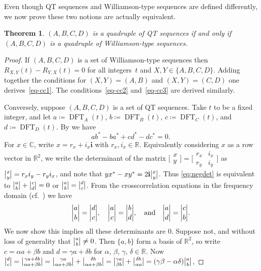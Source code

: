 \documentclass[12pt]{article}
\numberwithin{equation}{section}
\newtheorem{theorem}{Theorem}
\newcommand{\qi}{\mathbf{i}}
\newcommand{\C}{\mathbb{C}}
\newcommand{\R}{\mathbb{R}}
\DeclareMathOperator{\DFT}{DFT}
\newcommand{\detii}{\genfrac{\lvert}{\rvert}{0pt}{}}
\begin{document}
Even though QT sequences and Williamson-type sequences are defined
differently, we now prove these two notions are actually equivalent.

\begin{theorem}
$(A,B,C,D)$ is a quadruple of QT sequences if and only if $(A,B,C,D)$ is a quadruple of
Williamson-type sequences.
\label{thm:qt-wt-equiv}
\end{theorem}

\begin{proof}
If $(A,B,C,D)$ is a set of Williamson-type sequences then $R_{X,Y}(t)-R_{Y,X}(t)=0$
for all integers~$t$ and $X,Y\in\{A,B,C,D\}$.  Adding together the conditions
for $(X,Y)=(A,B)$ and $(X,Y)=(C,D)$
one derives~\eqref{eq-cc1}.  The conditions~\eqref{eq-cc2} and~\eqref{eq-cc3}
are derived similarly.

Conversely, suppose $(A,B,C,D)$ is a set of QT sequences. Take $t$ to be a fixed integer,
and let $a\coloneqq\DFT_A(t)$, $b\coloneqq\DFT_B(t)$, $c\coloneqq\DFT_C(t)$, and
$d\coloneqq\DFT_D(t)$.  By  we have
\begin{equation} ab^* - ba^* + cd^* - dc^* = 0. \label{eq:negdet} \end{equation}
For $x\in\C$, write $x=r_x+i_x\qi$ with $r_x,i_x\in\R$.
Equivalently considering $x$ as a row vector in $\R^2$,
we write the determinant of the matrix $\bigl[\begin{smallmatrix}x\\y\end{smallmatrix}\bigr]=\bigl[\begin{smallmatrix}r_x&i_x\\r_y&i_y\end{smallmatrix}\bigr]$
as $\detii{x}{y}=r_xi_y-r_yi_x$, and note that $yx^*-xy^*=2\qi\detii{x}{y}$.
Thus \eqref{eq:negdet} is equivalent to $\detii{a}{b}+\detii{c}{d} = 0$ or
$\detii{a}{b}=\detii{d}{c}$.  From the crosscorrelation equations in the
frequency domain (cf.~) we have
\begin{equation} \detii{a}{b}=\detii{d}{c}, \quad \detii{a}{c}=\detii{b}{d}, \quad\text{and}\quad \detii{a}{d}=\detii{c}{b} . \label{eq:dets} \end{equation}
We now show this implies all these determinants are $0$.  Suppose not, and without loss
of generality that $\detii{a}{b}\neq0$.  Then $\{a,b\}$ form a basis of $\R^2$, so write
$c=\alpha a + \beta b$ and $d=\gamma a + \delta b$ for $\alpha$, $\beta$, $\gamma$, $\delta\in\R$.
Now
$\detii{d}{c}=\detii{\gamma a+\delta b}{\alpha a+\beta b}=\detii{\gamma a}{\alpha a+\beta b}+\detii{\delta b}{\alpha a+\beta b}=\detii{\gamma a}{\beta b}+\detii{\delta b}{\alpha a}=(\gamma\beta-\alpha\delta)\detii{a}{b}$,

\end{proof}
\end{document}
